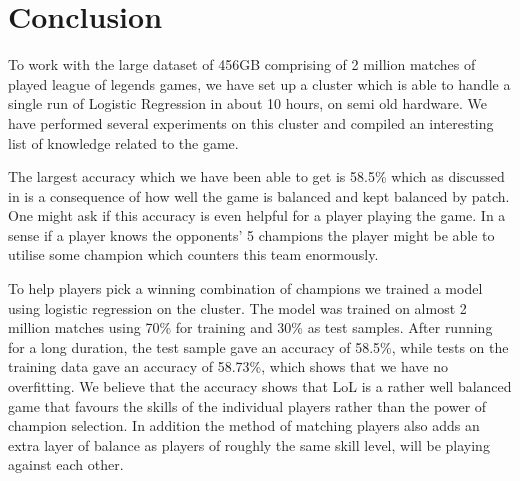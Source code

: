 \section{Conclusion}\label{sec:conclusion}
To work with the large dataset of 456GB comprising of 2 million matches of played league of legends games, we have set up a cluster which is able to handle a single run of Logistic Regression in about 10 hours, on semi old hardware. We have performed several experiments on this cluster and compiled an interesting list of knowledge related to the game.

The largest accuracy which we have been able to get is 58.5\% which as discussed in  is a consequence of how well the game is balanced and kept balanced by patch. One might ask if this accuracy is even helpful for a player playing the game. In a sense if a player knows the opponents' 5 champions the player might be able to utilise some champion which counters this team enormously.

To help players pick a winning combination of champions we trained a model using logistic regression on the cluster. The model was trained on almost 2 million matches using 70\% for training and 30\% as test samples. After running for a long duration, the test sample gave an accuracy of 58.5\%, while tests on the training data gave an accuracy of 58.73\%, which shows that we have no overfitting. We believe that the accuracy shows that LoL is a rather well balanced game that favours the skills of the individual players rather than the power of champion selection. In addition the method of matching players also adds an extra layer of balance as players of roughly the same skill level, will be playing against each other.



